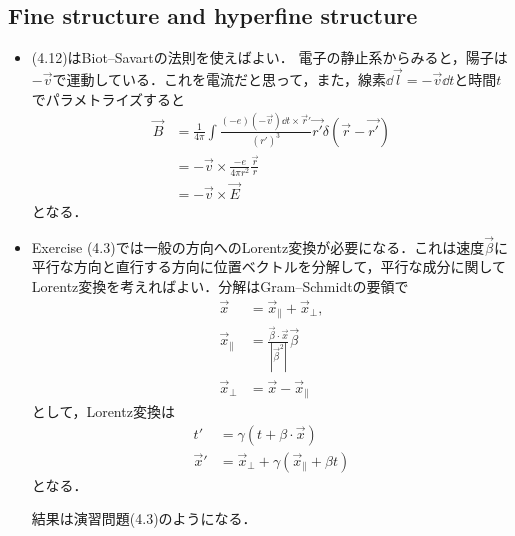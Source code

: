 \subsection{Fine structure and hyperfine structure}
\begin{itemize}
		\item (4.12)はBiot--Savartの法則を使えばよい．
				電子の静止系からみると，陽子は$-\vec{v} $で運動している．これを電流だと思って，また，線素$\dd{\vec{l}}=-\vec{v}\dd{t} $と時間$t $でパラメトライズすると
				\begin{align}
						\vec{B} &= \frac{1}{4\pi}\int\frac{(-e)(-\vec{v})\dd{t}\times\vec{r}'}{(r')^3}\vec{r'}\delta(\vec{r} - \vec{r'})\\
								&= -\vec{v}\times \frac{-e}{4\pi r^2}\frac{\vec{r}}{r}\\
								&= -\vec{v} \times \vec{E}
				\end{align}
				となる．
		\item Exercise (4.3)では一般の方向へのLorentz変換が必要になる．これは速度$\vec{\beta} $に平行な方向と直行する方向に位置ベクトルを分解して，平行な成分に関してLorentz変換を考えればよい．分解はGram--Schmidtの要領で
				\begin{align}
						\vec{x} &= \vec{x}_{\parallel}+\vec{x}_{\perp},\\
						\vec{x}_{\parallel} &= \frac{\vec{\beta}\cdot\vec{x}}{|\vec{\beta}^2|}\vec{\beta}\\
						\vec{x}_{\perp} &= \vec{x} - \vec{x}_{\parallel}
				\end{align}
				として，Lorentz変換は
				\begin{align}
						t' &= \gamma(t + \beta \cdot \vec{x})\\
						\vec{x}' &= \vec{x}_{\perp} + \gamma(\vec{x}_{\parallel} + \beta t)
				\end{align}
				となる．
				
				結果は演習問題(4.3)のようになる．
\end{itemize}
